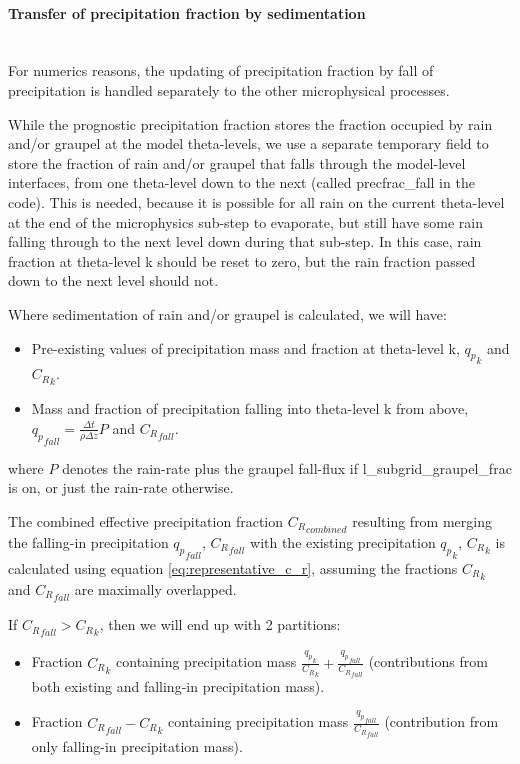 \documentclass{UMDP_article}
\begin{document}
\paragraph{Transfer of precipitation fraction by sedimentation}
\label{sec:precfrac_sed}
~\\

For numerics reasons, the updating of precipitation fraction by fall
of precipitation is handled separately to the other microphysical processes.

While the prognostic precipitation fraction stores the fraction occupied by
rain and/or graupel at the model theta-levels, we use a separate temporary
field to store the fraction of rain and/or graupel that falls through the
model-level interfaces, from one theta-level down to the next
(called precfrac\_fall in the code).
This is needed, because it is possible for all rain on the current theta-level
at the end of the microphysics sub-step to evaporate, but still have some
rain falling through to the next level down during that sub-step.
In this case, rain fraction at theta-level k should be reset to zero,
but the rain fraction passed down to the next level should not.

Where sedimentation of rain and/or graupel is calculated, we will have:
\begin{itemize}
\item Pre-existing values of precipitation mass and fraction at theta-level k,
      ${q_p}_k$ and ${C_R}_k$.
\item Mass and fraction of precipitation falling into theta-level k from above,
      ${q_p}_{fall} = \frac{\Delta t}{\rho \Delta z} P$ and ${C_R}_{fall}$.
\end{itemize}

where $P$ denotes the rain-rate plus the graupel fall-flux if
l\_subgrid\_graupel\_frac is on, or just the rain-rate otherwise.

The combined effective precipitation fraction ${C_R}_{combined}$ resulting from
merging the falling-in precipitation ${q_p}_{fall}$, ${C_R}_{fall}$
with the existing precipitation ${q_p}_k$, ${C_R}_k$ is calculated using
equation \ref{eq:representative_c_r}, assuming the fractions
${C_R}_k$ and ${C_R}_{fall}$ are maximally overlapped.

If ${C_R}_{fall} > {C_R}_k$, then we will end up with 2 partitions:

\begin{itemize}
\item Fraction ${C_R}_k$ containing precipitation mass
      $\frac{{q_p}_k}{{C_R}_k} + \frac{{q_p}_{fall}}{{C_R}_{fall}}$
      (contributions from both existing and falling-in precipitation mass).
\item Fraction ${C_R}_{fall} - {C_R}_k$ containing precipitation mass
      $\frac{{q_p}_{fall}}{{C_R}_{fall}}$
      (contribution from only falling-in precipitation mass).
\end{itemize}
\end{document}
